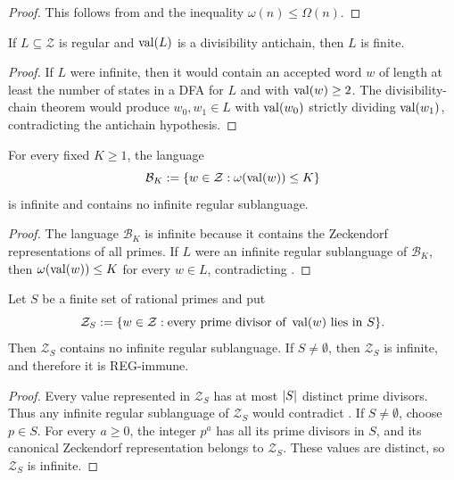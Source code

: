 \begin{proof}
  This follows from
   and the inequality
  \(\omega(n)\le\Omega(n)\).
\end{proof}

\begin{corollary}
  \label{cor:divisibility-antichain-obstruction}
  If \(L\subseteq\mathcal Z\) is regular and \(\operatorname{val}(L)\) is a
  divisibility antichain, then \(L\) is finite.
\end{corollary}

\begin{proof}
  If \(L\) were infinite, then it would contain an accepted word
  \(w\) of length at least the number of states in a DFA for \(L\) and
  with \(\operatorname{val}(w)\ge2\). The
  divisibility-chain theorem would produce \(w_0,w_1\in L\) with
  \(\operatorname{val}(w_0)\) strictly dividing \(\operatorname{val}(w_1)\), contradicting the
  antichain hypothesis.
\end{proof}

\begin{corollary}
  \label{cor:bounded-distinct-prime-zeckendorf-languages-reg-immune}
  For every fixed \(K\ge1\), the language
  \[
    \mathcal B_K
      :=\{w\in\mathcal Z:\omega(\operatorname{val}(w))\le K\}
  \]
  is infinite and contains no infinite regular sublanguage.
\end{corollary}

\begin{proof}
  The language \(\mathcal B_K\) is infinite because it contains the
  Zeckendorf representations of all primes. If \(L\) were an infinite
  regular sublanguage of \(\mathcal B_K\), then
  \(\omega(\operatorname{val}(w))\le K\) for every \(w\in L\), contradicting
  .
\end{proof}

\begin{corollary}
  \label{cor:finite-prime-support-zeckendorf-languages-reg-immune}
  Let \(S\) be a finite set of rational primes and put
  \[
    \mathcal Z_S
      :=\{w\in\mathcal Z:
          \text{every prime divisor of }\operatorname{val}(w)\text{ lies in }S\}.
  \]
  Then \(\mathcal Z_S\) contains no infinite regular sublanguage. If
  \(S\neq\emptyset\), then \(\mathcal Z_S\) is infinite, and therefore
  it is REG-immune.
\end{corollary}

\begin{proof}
  Every value represented in \(\mathcal Z_S\) has at most \(\lvert S \rvert\)
  distinct prime divisors. Thus any infinite regular sublanguage of
  \(\mathcal Z_S\) would contradict
  . If \(S\neq\emptyset\),
  choose \(p\in S\). For every \(a\ge0\), the integer \(p^a\) has all
  its prime divisors in \(S\), and its canonical Zeckendorf
  representation belongs to \(\mathcal Z_S\). These values are
  distinct, so \(\mathcal Z_S\) is infinite.
\end{proof}

